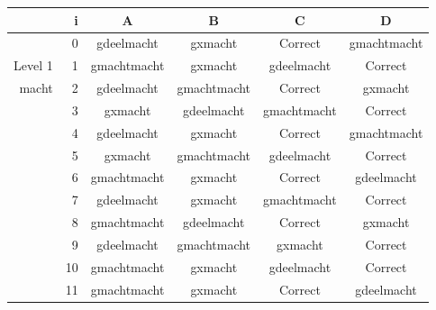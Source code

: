 \begin{tabular}{ rr| c|c|c|c}\hline\hline
     & i & \textbf{A} & \textbf{B} & \textbf{C} & \textbf{D}\\\hline

&0&gdeelmacht&gxmacht&Correct\cellcolor[gray]{0.6}&gmachtmacht\\
Level 1 & 1&gmachtmacht&gxmacht&gdeelmacht&Correct\cellcolor[gray]{0.6}\\
macht &2&gdeelmacht&gmachtmacht&Correct\cellcolor[gray]{0.6}&gxmacht\\
&3&gxmacht&gdeelmacht&gmachtmacht&Correct\cellcolor[gray]{0.6}\\
&4&gdeelmacht&gxmacht&Correct\cellcolor[gray]{0.6}&gmachtmacht\\
&5&gxmacht&gmachtmacht&gdeelmacht&Correct\cellcolor[gray]{0.6}\\
&6&gmachtmacht&gxmacht&Correct\cellcolor[gray]{0.6}&gdeelmacht\\
&7&gdeelmacht&gxmacht&gmachtmacht&Correct\cellcolor[gray]{0.6}\\
&8&gmachtmacht&gdeelmacht&Correct\cellcolor[gray]{0.6}&gxmacht\\
&9&gdeelmacht&gmachtmacht&gxmacht&Correct\cellcolor[gray]{0.6}\\
&10&gmachtmacht&gxmacht&gdeelmacht&Correct\cellcolor[gray]{0.6}\\
&11&gmachtmacht&gxmacht&Correct\cellcolor[gray]{0.6}&gdeelmacht\\
\hline\end{tabular}\par\ \newline

